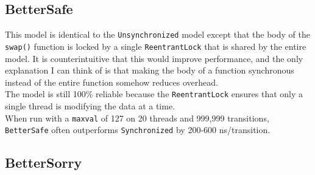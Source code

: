 \documentclass[]{article}
\begin{document}
\subsection{BetterSafe}
This model is identical to the \texttt{Unsynchronized} model except that the body of the \texttt{swap()} function is locked by a single \texttt{ReentrantLock} that is shared by the entire model. It is counterintuitive that this would improve performance, and the only explanation I can think of is that making the body of a function synchronous instead of the entire function somehow reduces overhead.\\

The model is still 100\% reliable because the \texttt{ReentrantLock} ensures that only a single thread is modifying the data at a time.\\

When run with a \texttt{maxval} of 127 on 20 threads and 999,999 transitions, \texttt{BetterSafe} often outperforms \texttt{Synchronized} by 200-600 ns/transition.
\subsection{BetterSorry}
\end{document}
